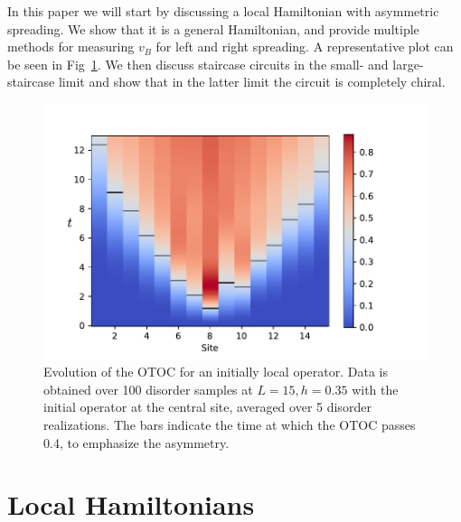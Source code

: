 \documentclass[aps,prx,reprint,superscriptaddress, longbibliography]{revtex4-1}
\newcommand{\charlie}[1]{{\color{Magenta}{{#1}}}}
\begin{document}
In this paper we will start by discussing a local Hamiltonian with asymmetric spreading. We show that it is a general Hamiltonian, and provide multiple methods for measuring $v_B$ for left and right spreading. A representative plot can be seen in Fig~\ref{fig:colorplot}. We then discuss staircase circuits in the small- and large-staircase limit and show that in the latter limit the circuit is completely chiral.


\begin{figure}
	\includegraphics[width=\columnwidth]{colorplot}
	\caption{Evolution of the OTOC for an initially local operator. Data is obtained over 100 disorder samples at $L=15, h=0.35$ with the initial operator at the central site, averaged over 5 disorder realizations. The bars indicate the time at which the OTOC passes 0.4, to emphasize the asymmetry.}
	\label{fig:colorplot}
\end{figure}


\section{Local Hamiltonians}

\end{document}
